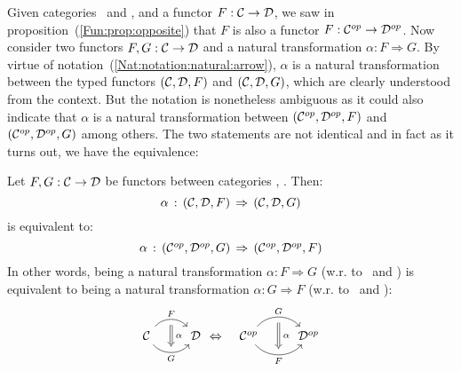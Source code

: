 Given categories \Cat\ and \Dat, and a functor $F:\mbox{$\cal C$}\to\mbox{$\cal D$}$, we saw
in proposition~(\ref{Fun:prop:opposite}) that $F$ is also a functor 
$F:\mbox{${\cal C}^{op}$}\to\mbox{${\cal D}^{op}$}$. Now consider two functors $F,G:\mbox{$\cal C$}\to\mbox{$\cal D$}$ and a natural 
transformation $\alpha:F \Rightarrow G$. By virtue of 
notation~(\ref{Nat:notation:natural:arrow}), $\alpha$ is a natural 
transformation between the typed functors $(\mbox{$\cal C$},\mbox{$\cal D$},F)$ and $(\mbox{$\cal C$},\mbox{$\cal D$},G)$, 
which are clearly understood from the context. But the notation is nonetheless 
ambiguous as it could also indicate that $\alpha$ is a natural
transformation between $(\mbox{${\cal C}^{op}$},\mbox{${\cal D}^{op}$},F)$ and $(\mbox{${\cal C}^{op}$},\mbox{${\cal D}^{op}$},G)$ among others. 
The two statements are not identical and in fact as it turns out, we
have the equivalence:

\begin{prop}\label{Nat:prop:opposite}
    Let $F,G:\mbox{$\cal C$}\to\mbox{$\cal D$}$ be functors between categories \Cat, \Dat. Then: 
    \[
        \alpha\,:\,(\mbox{$\cal C$},\mbox{$\cal D$},F)\,\Rightarrow\,(\mbox{$\cal C$},\mbox{$\cal D$},G)
    \]
    is equivalent to:
    \[
        \alpha\,:\,(\mbox{${\cal C}^{op}$},\mbox{${\cal D}^{op}$},G)\,\Rightarrow\,(\mbox{${\cal C}^{op}$},\mbox{${\cal D}^{op}$},F)
    \]
    In other words, being a natural transformation $\alpha:F\Rightarrow G$ (w.r.
    to \Cat\ and \Dat) is equivalent to being a natural transformation 
    $\alpha:G\Rightarrow F$ (w.r. to \Cop\ and \Dop):
    \begin{eqnarray}
        \begin{tikzcd}
            \Cat \arrow[r, "F", bend left  = 50, ""{name=U, below}]
                 \arrow[r, swap, "G", bend right = 50, ""{name=D, above}]
              & \Dat
            \arrow[Rightarrow, "\,\alpha", from = U, to = D]
        \end{tikzcd}
        &\Leftrightarrow&
        \begin{tikzcd}
            \Cop \arrow[r, "G", bend left  = 50, ""{name=U, below}]
                 \arrow[r, swap, "F", bend right = 50, ""{name=D, above}]
              & \Dop
            \arrow[Rightarrow, "\,\alpha", from = U, to = D]
        \end{tikzcd}
    \end{eqnarray}
\end{prop}
